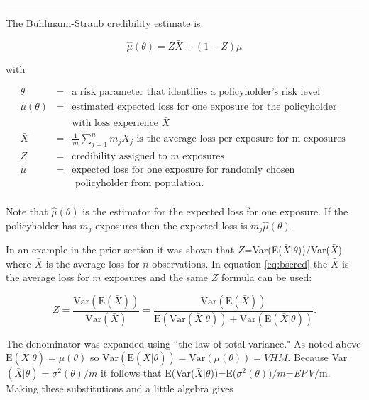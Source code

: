 \documentclass[]{book}
\theoremstyle{definition}
\theoremstyle{definition}
\theoremstyle{definition}
\theoremstyle{remark}
\begin{document}
\begin{center}\rule{0.5\linewidth}{\linethickness}\end{center}

The Bühlmann-Straub credibility estimate is:

\begin{equation}\hat{\mu}(\theta)=Z\bar{X}+(1-Z)\mu 
\label{eq:bscred} 
\end{equation}

with

\begin{eqnarray*} 
\theta&=&\textrm{a risk parameter that identifies a policyholder's risk level}\\
\hat{\mu}(\theta)&=&\textrm{estimated expected loss for one exposure for the policyholder}\\
 & & \textrm{with loss experience } \bar{X}\\
\bar{X}&=& \frac{1}{m} \sum_{j=1}^{n} m_j X_j \textrm{ is the average loss per exposure for m exposures } \\
Z&=&\textrm{credibility assigned to $m$ exposures } \\
 \mu&=&\textrm{expected loss for one exposure for randomly chosen}\\
 & & \textrm{ policyholder from population.}\\
\end{eqnarray*}

Note that \(\hat{\mu}(\theta)\) is the estimator for the expected loss
for one exposure. If the policyholder has \(m_j\) exposures then the
expected loss is \(m_j\hat{\mu}(\theta)\).

In an example in the prior section it was shown that
\(Z\)=Var(E(\(\bar{X}|\theta\)))/Var(\(\bar{X}\)) where \(\bar{X}\) is
the average loss for \(n\) observations. In equation \eqref{eq:bscred} the
\(\bar{X}\) is the average loss for \(m\) exposures and the same \(Z\)
formula can be used:

\begin{equation*} 
Z=\frac{\mathrm{Var}(\mathrm{E}(\bar{X}))}{\mathrm{Var}(\bar{X})}=
\frac{\mathrm{Var}(\mathrm{E}(\bar{X}))}{\mathrm{E}(\mathrm{Var}(\bar{X}|\theta))+\mathrm{Var}(\mathrm{E}(\bar{X}|\theta))}. 
\end{equation*}

The denominator was expanded using ``the law of total variance." As
noted above \(\mathrm{E}(\bar{X}|\theta)=\mu(\theta)\) so
\(\mathrm{Var}(\mathrm{E}(\bar{X}|\theta))=\mathrm{Var}(\mu(\theta))=VHM\).
Because Var\((\bar{X}|\theta)=\sigma^2(\theta)/m\) it follows that
E(Var(\(\bar{X}|\theta\)))=E(\(\sigma^2(\theta))/m\)=\emph{EPV}/m.
Making these substitutions and a little algebra gives
\end{document}

